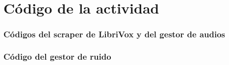 \chapter{Código de la actividad}

\subsection{Códigos del scraper de LibriVox y del gestor de audios}




\subsection{Código del gestor de ruido}

